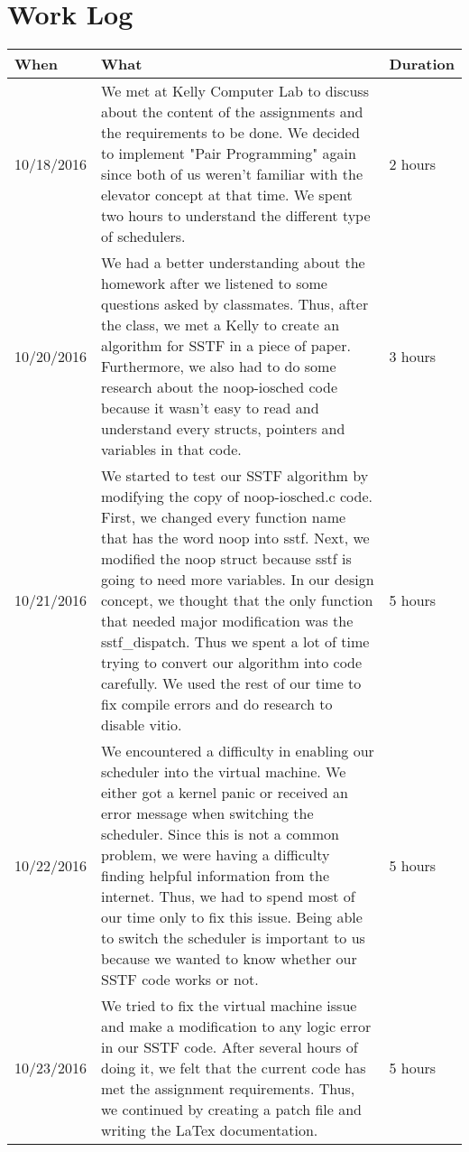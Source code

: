 \documentclass[letterpaper,10pt,draftclsnofoot,titlepage,onecolumn]{IEEEtran}
\begin{document}
\section{Work Log}
\begin{center}
\begin{tabular}{ |m{2cm}|m{10cm}|m{2cm}| }
\hline
When & What & Duration \\ \hline
10/18/2016 
& We met at Kelly Computer Lab to discuss about the content of the assignments and the requirements to be done. We decided to implement "Pair Programming" again since both of us weren't familiar with the elevator concept at that time. We spent two hours to understand the different type of schedulers. 
& 2 hours\\ 
\hline

10/20/2016 
& We had a better understanding about the homework after we listened to some questions asked by classmates. Thus, after the class, we met a Kelly to create an algorithm for SSTF in a piece of paper. Furthermore, we also had to do some research about the noop-iosched code because it wasn't easy to read and understand every structs, pointers and variables in that code.  
& 3 hours\\ 
\hline

10/21/2016 
& We started to test our SSTF algorithm by modifying the copy of noop-iosched.c code. First, we changed every function name that has the word noop into sstf. Next, we modified the noop struct because sstf is going to need more variables.  In our design concept, we thought that the only function that needed major modification was the sstf\_dispatch. Thus we spent a lot of time trying to convert our algorithm into code carefully. We used the rest of our time to fix compile errors and do research to disable vitio.
& 5 hours\\ 
\hline

10/22/2016 
& We encountered a difficulty in enabling our scheduler into the virtual machine. We either got a kernel panic or received an error message when switching the scheduler.
Since this is not a common problem, we were having a difficulty finding helpful information from the internet. Thus, we had to spend most of our time only to fix this issue. Being able to switch the scheduler is important to us because we wanted to know whether our SSTF code works or not. 
& 5 hours\\ 
\hline

10/23/2016 
& We tried to fix the virtual machine issue and make a modification to any logic error in our SSTF code. After several hours of doing it, we felt that the current code has met the assignment requirements. Thus, we continued by creating a patch file and writing the LaTex documentation.
& 5 hours\\
\hline
\end{tabular}
\end{center}
\end{document}
